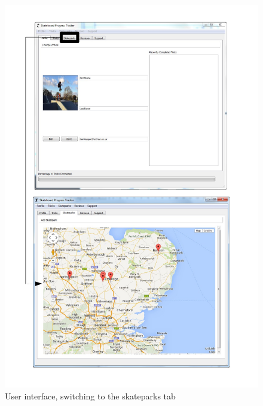 \begin{figure}[H]
    \includegraphics[width=\textwidth]{./Maintenance/Figures/SkateparkTab.pdf}
    \caption{User interface, switching to the skateparks tab} \label{fig:Skatepark Tab UI}
\end{figure}


